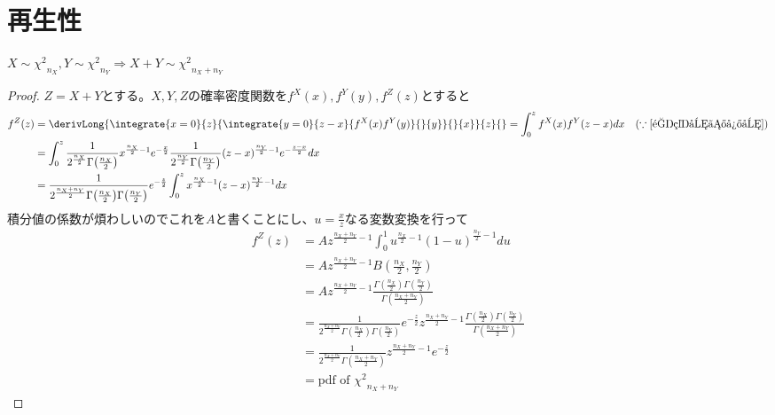     \section{再生性}
        \begin{shadebox}
            $X\sim{\chi^2}_{n_X}, Y\sim{\chi^2}_{n_Y} \Rightarrow X+Y\sim{\chi^2}_{n_X+n_Y}$
        \end{shadebox}
        \begin{proof}
            \quad\par
            $Z=X+Y$とする。$X,Y,Z$の確率密度関数を$f^X(x),f^Y(y),f^Z(z)$とすると
            \begin{align*}
                f^Z(z) &= \derivLong{\integrate{x=0}{z}{\integrate{y=0}{z-x}{f^X(x)f^Y(y)}{}{y}}{}{x}}{z}{} = \int_{0}^{z}{f^X(x)f^Y(z-x) dx} \quad(\because\ref{重積分の微分})\\
                &= \int_{0}^{z}{\frac{1}{2^{\frac{n_X}{2}}\Gamma{\left(\frac{n_X}{2}\right)}}x^{\frac{n_X}{2}-1}e^{-\frac{x}{2}}\frac{1}{2^{\frac{n_Y}{2}}\Gamma{\left(\frac{n_Y}{2}\right)}}(z-x)^{\frac{n_Y}{2}-1}e^{-\frac{z-x}{2}} dx}\\
                &= \frac{1}{2^{\frac{n_X+n_Y}{2}}\Gamma{\left(\frac{n_X}{2}\right)}\Gamma{\left(\frac{n_Y}{2}\right)}}e^{-\frac{z}{2}}\int_{0}^{z}{x^{\frac{n_X}{2}-1}(z-x)^{\frac{n_Y}{2}-1} dx}
            \end{align*}
            積分値の係数が煩わしいのでこれを$A$と書くことにし、$u=\frac{x}{z}$なる変数変換を行って
            \begin{align*}
                f^Z(z) &= Az^{\frac{n_X+n_Y}{2}-1}\int_{0}^{1}{u^{\frac{n_X}{2}-1}(1-u)^{\frac{n_Y}{2}-1} du}\\
                &= Az^{\frac{n_X+n_Y}{2}-1}B\left(\frac{n_X}{2},\frac{n_Y}{2}\right)\\
                &= Az^{\frac{n_X+n_Y}{2}-1}\frac{\Gamma{\left(\frac{n_X}{2}\right)}\Gamma{\left(\frac{n_Y}{2}\right)}}{\Gamma{\left(\frac{n_X+n_Y}{2}\right)}}\\
                &= \frac{1}{2^{\frac{n_X+n_Y}{2}}\Gamma{\left(\frac{n_X}{2}\right)}\Gamma{\left(\frac{n_Y}{2}\right)}}e^{-\frac{z}{2}}z^{\frac{n_X+n_Y}{2}-1}\frac{\Gamma{\left(\frac{n_X}{2}\right)}\Gamma{\left(\frac{n_Y}{2}\right)}}{\Gamma{\left(\frac{n_X+n_Y}{2}\right)}}\\
                &= \frac{1}{2^{\frac{n_X+n_Y}{2}}\Gamma{\left(\frac{n_X+n_Y}{2}\right)}}z^{\frac{n_X+n_Y}{2}-1}e^{-\frac{z}{2}}\\
                &= \text{pdf of }{\chi^2}_{n_X+n_Y}
            \end{align*}
        \end{proof}
